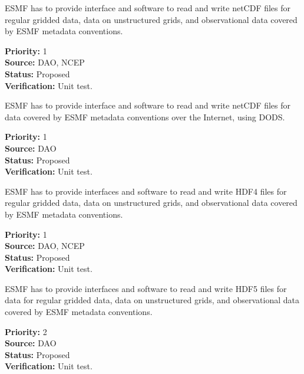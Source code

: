 
ESMF has to provide interface and software to read and write netCDF
files for regular gridded data, data on unstructured grids, and observational 
data  covered by ESMF metadata conventions. 

\begin{reqlist}
{\bf Priority:} 1 \\
{\bf Source:} DAO, NCEP \\
{\bf Status:} Proposed \\
{\bf Verification:} Unit test. \\
\end{reqlist}


ESMF has to provide interface and software to read and write netCDF
files for data covered by ESMF metadata conventions over the Internet, 
using DODS.

\begin{reqlist}
{\bf Priority:} 1 \\
{\bf Source:} DAO \\
{\bf Status:} Proposed \\
{\bf Verification:} Unit test. \\
\end{reqlist}


ESMF has to provide interfaces and software to read and write HDF4
files for regular gridded data, data on unstructured grids, and observational 
data  covered by ESMF metadata conventions.
 

\begin{reqlist}
{\bf Priority:} 1 \\
{\bf Source:} DAO, NCEP \\
{\bf Status:} Proposed \\
{\bf Verification:} Unit test. \\
\end{reqlist}


ESMF has to provide interfaces and software to read and write HDF5
files for data for regular gridded data, data on unstructured grids, and 
observational data  covered by ESMF metadata conventions.

\begin{reqlist}
{\bf Priority:} 2 \\
{\bf Source:} DAO \\
{\bf Status:} Proposed \\
{\bf Verification:} Unit test. 
\end{reqlist}

